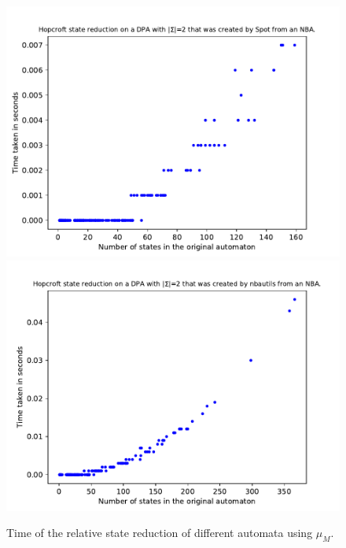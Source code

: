\begin{figure}
\begin{minipage}{0.49\textwidth}
		\includegraphics[page=1,height=.3\textheight]{../data/analysis/hopcroft/detspot_ap1.pdf} 
		\includegraphics[page=1,height=.3\textheight]{../data/analysis/hopcroft/detnbaut_ap1.pdf} 
		\caption{Time of the relative state reduction of different automata using $\mu_M$.}
		\label{fig:skip:empirical_moore_time}
	\end{minipage}
\end{figure}

